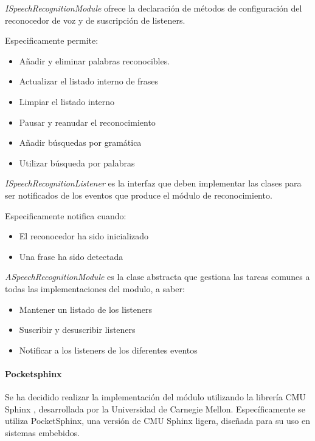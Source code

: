 \textit{ISpeechRecognitionModule} ofrece la declaración de métodos de configuración del reconocedor de  voz y de suscripción de listeners.


Especificamente permite:
\begin{itemize}
 	\item Añadir y eliminar palabras reconocibles.
 	\item Actualizar el listado interno de frases
	\item Limpiar el listado interno
	\item Pausar y reanudar el reconocimiento
	\item Añadir búsquedas por gramática
	\item Utilizar búsqueda por palabras
 	 
\end{itemize}
\newpage


\textit{ISpeechRecognitionListener} es la interfaz que deben implementar las clases para ser notificados de los eventos que produce el módulo de reconocimiento.

Especificamente notifica cuando:
\begin{itemize}
	\item El reconocedor ha sido inicializado
	\item Una frase ha sido detectada
\end{itemize}

   


\textit{ASpeechRecognitionModule} es la clase abstracta que gestiona las tareas comunes a todas las implementaciones del modulo, a saber:

\begin{itemize}
	\item Mantener un listado de los listeners
	\item Suscribir y desuscribir listeners
	\item Notificar a los listeners de los diferentes eventos
\end{itemize}





\paragraph*{Pocketsphinx\\}


Se ha decidido realizar la implementación del módulo utilizando la librería CMU Sphinx \cite{cmusphinx}, desarrollada por la Universidad de Carnegie Mellon.
Específicamente se utiliza PocketSphinx, una versión de CMU Sphinx ligera, diseñada para su uso en sistemas embebidos.


